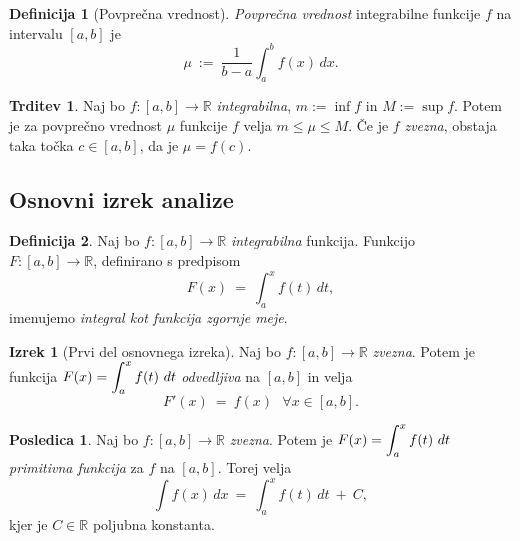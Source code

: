 \documentclass[11pt]{article}
\theoremstyle{definition}
\newtheorem{definicija}{Definicija}[section]
\theoremstyle{definition}
\newtheorem{trditev}{Trditev}[section]
\theoremstyle{definition}
\newtheorem{izrek}{Izrek}[section]
\theoremstyle{theorem}
\newtheorem*{posledica}{Posledica}
\begin{document}
\begin{definicija}[Povprečna vrednost]

\textit{Povprečna vrednost} integrabilne funkcije $f$ na intervalu $[a, b]$ je 
$$\mu ~:=~ \frac{1}{b-a} \int_{a}^{b} f(x)\,dx.$$

\end{definicija}
\vspace{0.5cm}

\begin{trditev}

Naj bo $f:[a, b] \rightarrow \mathbb{R}$ \textit{integrabilna}, $m := \inf{f}$ in $M := \sup{f}$. Potem je za povprečno vrednost $\mu$ funkcije $f$ velja $m \leq \mu \leq M$. Če je $f$ \textit{zvezna}, obstaja taka točka $c \in [a, b]$, da je $\mu = f(c)$.

\end{trditev}
\vspace{0.5cm}


\subsection{Osnovni izrek analize}
\vspace{0.5cm}

\begin{definicija}

Naj bo $f:[a, b] \rightarrow \mathbb{R}$ \textit{integrabilna} funkcija. Funkcijo \\$F:[a, b] \rightarrow \mathbb{R}$, definirano s predpisom
$$F(x) ~=~ \int_{a}^{x} f(t)\,dt,$$
imenujemo \textit{integral kot funkcija zgornje meje}.

\end{definicija}
\vspace{0.5cm}

\begin{izrek}[Prvi del osnovnega izreka]

Naj bo $f:[a, b] \rightarrow \mathbb{R}$ \textit{zvezna}. Potem je funkcija $F(x) = \mathlarger{\int_a^x f(t)~dt}$ \textit{odvedljiva} na $[a, b]$ in velja
$$F'(x) ~=~ f(x) ~~~ \forall x \in [a, b].$$

\end{izrek}
\vspace{0.5cm}

\begin{posledica}

Naj bo $f:[a, b] \rightarrow \mathbb{R}$ \textit{zvezna}. Potem je $F(x) = \mathlarger{\int_a^x f(t)~dt}$ \textit{primitivna funkcija} za $f$ na $[a, b]$. Torej velja
$$\int f(x)\,dx ~=~ \int_a^x f(t)\,dt ~+~ C,$$
kjer je $C \in \mathbb{R}$ poljubna konstanta.

\end{posledica}
\vspace{0.5cm}
\end{document}
